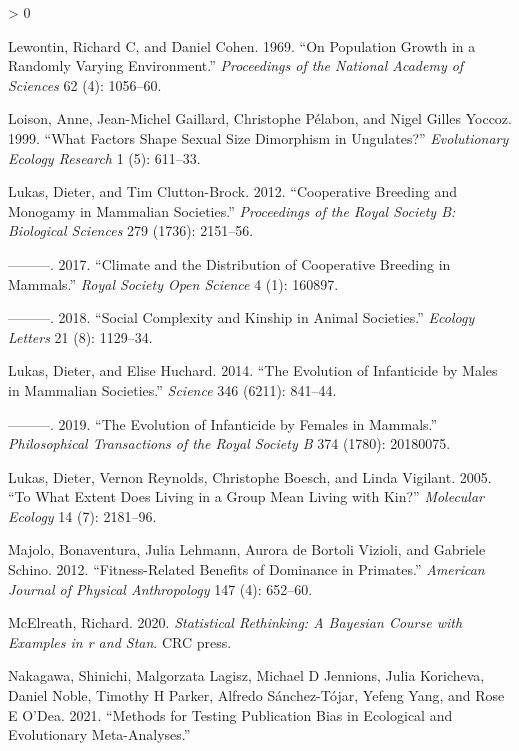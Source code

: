 \documentclass[
]{article}
\newlength{\cslhangindent}
\newenvironment{CSLReferences}[2] %
 {%
  \setlength{\parindent}{0pt}
  \ifodd #1 \everypar{\setlength{\hangindent}{\cslhangindent}}\ignorespaces\fi
  \ifnum #2 > 0
  \setlength{\parskip}{#2\baselineskip}
  \fi
 }%
 {}
\begin{document}
\begin{CSLReferences}{1}{0}
\leavevmode\hypertarget{ref-lewontin1969population}{}%
Lewontin, Richard C, and Daniel Cohen. 1969. {``On Population Growth in
a Randomly Varying Environment.''} \emph{Proceedings of the National
Academy of Sciences} 62 (4): 1056--60.

\leavevmode\hypertarget{ref-loison1999factors}{}%
Loison, Anne, Jean-Michel Gaillard, Christophe Pélabon, and Nigel Gilles
Yoccoz. 1999. {``What Factors Shape Sexual Size Dimorphism in
Ungulates?''} \emph{Evolutionary Ecology Research} 1 (5): 611--33.

\leavevmode\hypertarget{ref-lukas2012cooperative}{}%
Lukas, Dieter, and Tim Clutton-Brock. 2012. {``Cooperative Breeding and
Monogamy in Mammalian Societies.''} \emph{Proceedings of the Royal
Society B: Biological Sciences} 279 (1736): 2151--56.

\leavevmode\hypertarget{ref-lukas2017climate}{}%
---------. 2017. {``Climate and the Distribution of Cooperative Breeding
in Mammals.''} \emph{Royal Society Open Science} 4 (1): 160897.

\leavevmode\hypertarget{ref-lukas2018social}{}%
---------. 2018. {``Social Complexity and Kinship in Animal
Societies.''} \emph{Ecology Letters} 21 (8): 1129--34.

\leavevmode\hypertarget{ref-lukas2014evolution}{}%
Lukas, Dieter, and Elise Huchard. 2014. {``The Evolution of Infanticide
by Males in Mammalian Societies.''} \emph{Science} 346 (6211): 841--44.

\leavevmode\hypertarget{ref-lukas2019evolution}{}%
---------. 2019. {``The Evolution of Infanticide by Females in
Mammals.''} \emph{Philosophical Transactions of the Royal Society B} 374
(1780): 20180075.

\leavevmode\hypertarget{ref-lukas2005extent}{}%
Lukas, Dieter, Vernon Reynolds, Christophe Boesch, and Linda Vigilant.
2005. {``To What Extent Does Living in a Group Mean Living with Kin?''}
\emph{Molecular Ecology} 14 (7): 2181--96.

\leavevmode\hypertarget{ref-majolo2012fitness}{}%
Majolo, Bonaventura, Julia Lehmann, Aurora de Bortoli Vizioli, and
Gabriele Schino. 2012. {``Fitness-Related Benefits of Dominance in
Primates.''} \emph{American Journal of Physical Anthropology} 147 (4):
652--60.

\leavevmode\hypertarget{ref-mcelreath2020statistical}{}%
McElreath, Richard. 2020. \emph{Statistical Rethinking: A Bayesian
Course with Examples in r and Stan}. CRC press.

\leavevmode\hypertarget{ref-nakagawa2021methods}{}%
Nakagawa, Shinichi, Malgorzata Lagisz, Michael D Jennions, Julia
Koricheva, Daniel Noble, Timothy H Parker, Alfredo Sánchez-Tójar, Yefeng
Yang, and Rose E O'Dea. 2021. {``Methods for Testing Publication Bias in
Ecological and Evolutionary Meta-Analyses.''}


\end{CSLReferences}
\end{document}
